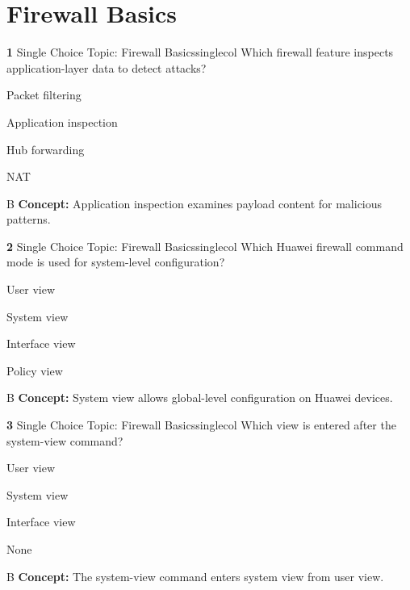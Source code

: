 \documentclass[10pt,a4paper]{article}
\begin{document}
\section{Firewall Basics}
\begin{qcard}{\color{white}\textbf{1} \hfill \small Single Choice \textbar{} Topic: Firewall Basics}{singlecol}
Which firewall feature inspects application-layer data to detect attacks?

\begin{qoptions}
\item Packet filtering
\item Application inspection
\item Hub forwarding
\item NAT
\end{qoptions}
\begin{explainbox}{B}
\textbf{Concept:} Application inspection examines payload content for malicious patterns.
\end{explainbox}
\end{qcard}

\begin{qcard}{\color{white}\textbf{2} \hfill \small Single Choice \textbar{} Topic: Firewall Basics}{singlecol}
Which Huawei firewall command mode is used for system-level configuration?

\begin{qoptions}
\item User view
\item System view
\item Interface view
\item Policy view
\end{qoptions}
\begin{explainbox}{B}
\textbf{Concept:} System view allows global-level configuration on Huawei devices.
\end{explainbox}
\end{qcard}

\begin{qcard}{\color{white}\textbf{3} \hfill \small Single Choice \textbar{} Topic: Firewall Basics}{singlecol}
Which view is entered after the system-view command?

\begin{qoptions}
\item User view
\item System view
\item Interface view
\item None
\end{qoptions}
\begin{explainbox}{B}
\textbf{Concept:} The system-view command enters system view from user view.
\end{explainbox}
\end{qcard}
\end{document}
